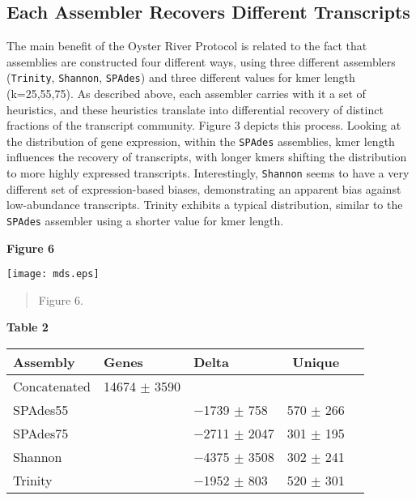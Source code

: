 \documentclass[10pt,letterpaper]{article}
\begin{document}
\subsection{Each Assembler Recovers Different Transcripts}

The main benefit of the Oyster River Protocol is related to the fact that assemblies are constructed four different ways, using three different assemblers (\texttt{Trinity}, \texttt{Shannon}, \texttt{SPAdes}) and three different values for kmer length (k=25,55,75). As described above, each assembler carries with it a set of heuristics, and these heuristics translate into differential recovery of distinct fractions of the transcript community. Figure 3 depicts this process. Looking at the distribution of gene expression, within the \texttt{SPAdes} assemblies, kmer length influences the recovery of transcripts, with longer kmers shifting the distribution to more highly expressed transcripts. Interestingly, \texttt{Shannon} seems to have a very different set of expression-based biases, demonstrating an apparent bias against low-abundance transcripts. Trinity exhibits a typical distribution, similar to the \texttt{SPAdes} assembler using a shorter value for kmer length. 


\textbf{\hypertarget{Figure 6}{Figure 6}} \\
\centerline{\texttt{[image: mds.eps]}}
\begin{quote}
\small{Figure 6.}
\end{quote} 

\begin{center}
\textbf{\hypertarget{Table 2}{Table 2}} \\
\begin{tabular}{l l l c c }
\textbf{Assembly} & \textbf{Genes} & \textbf{Delta} & \textbf{Unique}   \\ \hline
Concatenated & 14674 $\pm$ 3590 &  &  \\ \hline
SPAdes55 &  & $-$1739 $\pm$ 758  & 570 $\pm$ 266  \\ \hline
SPAdes75 &  & $-$2711 $\pm$ 2047  & 301 $\pm$ 195  \\ \hline
Shannon &  & $-$4375 $\pm$ 3508  & 302 $\pm$ 241  \\ \hline
Trinity &  & $-$1952 $\pm$ 803  & 520 $\pm$ 301  \\ \hline


\end{tabular}
\end{center}
\begin{quote}
\end{quote}
\end{document}
